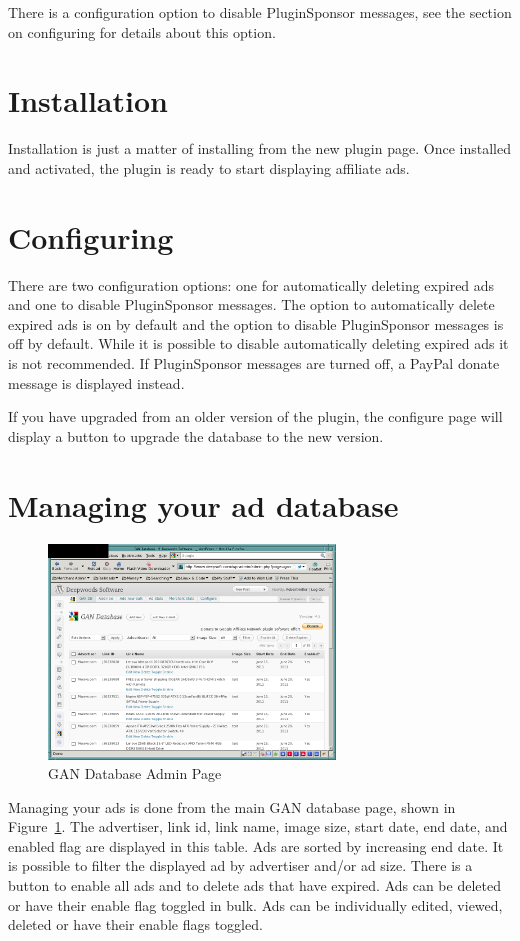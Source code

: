 \documentclass[letterpaper]{article}
\begin{document}
There is a configuration option to disable PluginSponsor messages, see
the section on configuring for details about this option.

\section{Installation}

Installation is just a matter of installing from the new plugin
page.  Once installed and activated, the plugin is ready to start
displaying affiliate ads.

\section{Configuring}

There are two configuration options: one for automatically deleting
expired ads and one to disable PluginSponsor messages.  The option to
automatically delete expired ads is on by default and the option to
disable PluginSponsor messages is off by default. While it is possible
to disable automatically deleting expired ads it is not recommended. If
PluginSponsor messages are turned off, a PayPal donate message is
displayed instead.

If you have upgraded from an older version of the plugin, the
configure page will display a button to upgrade the database to the new
version.

\section{Managing your ad database}

\begin{figure}[ht]
\begin{centering}
\includegraphics[width=3in]{gandatabase.png}
\caption{GAN Database Admin Page}
\label{fig:gandb}
\end{centering}
\end{figure}
Managing your ads is done from the main GAN database page, shown in
Figure~\ref{fig:gandb}. The advertiser, link id, link name, image size,
start date, end date, and enabled flag are displayed in this table. Ads
are sorted by increasing end date.  It is possible to filter the
displayed ad by advertiser and/or ad size.  There is a button to enable
all ads and to delete ads that have expired.  Ads can be deleted or
have their enable flag toggled in bulk.  Ads can be individually
edited, viewed, deleted or have their enable flags toggled.
\end{document}
